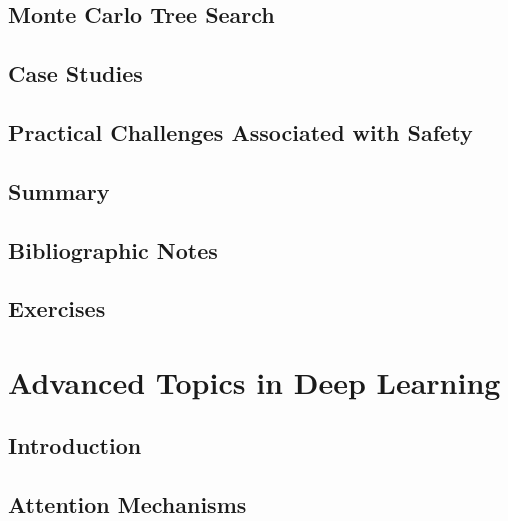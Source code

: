 \documentclass[a4paper]{article}
\begin{document}
\subsection{Monte Carlo Tree Search}

\subsection{Case Studies}

\subsection{Practical Challenges Associated with Safety}

\subsection{Summary}


\subsection{Bibliographic Notes}

\subsection{Exercises}

\newpage
\section{Advanced Topics in Deep Learning}
\subsection{Introduction}

\subsection{Attention Mechanisms}
\end{document}
